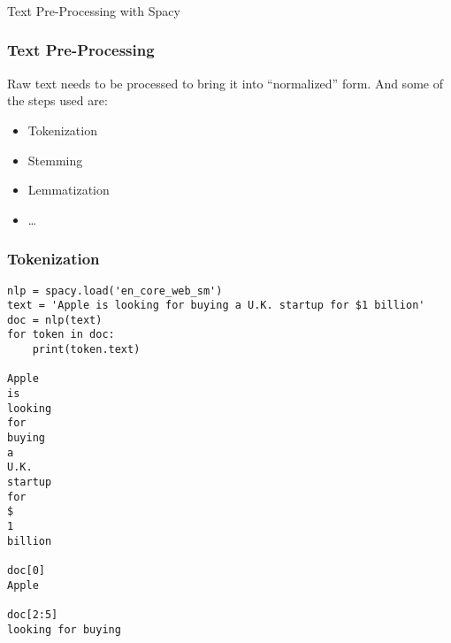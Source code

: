 
\begin{frame}[fragile]\frametitle{}

\begin{center}
{\Large Text Pre-Processing with Spacy}
\end{center}
\end{frame}

\begin{frame}[fragile]\frametitle{Text Pre-Processing}
Raw  text needs to be processed to bring it into ``normalized'' form. And some of the steps used are:

\begin{itemize}
\item Tokenization
\item Stemming
\item Lemmatization
\item \ldots
\end{itemize}
\end{frame}


\begin{frame}[fragile]\frametitle{Tokenization}

\begin{lstlisting}
nlp = spacy.load('en_core_web_sm')
text = 'Apple is looking for buying a U.K. startup for $1 billion'
doc = nlp(text)
for token in doc:
    print(token.text)
		
Apple
is
looking
for
buying
a
U.K.
startup
for
$
1
billion

doc[0]
Apple

doc[2:5]
looking for buying
\end{lstlisting}
\end{frame}


